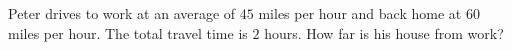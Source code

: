 Peter drives to work at an average of $45$ miles per hour and back home at $60$ miles per hour. The total travel time is $2$ hours. How far is his house from work?
